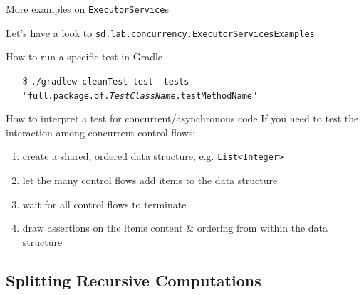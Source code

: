 \documentclass[presentation]{beamer}\mode<presentation>{\usetheme{AMSBolognaFC}}
\begin{document}
\begin{frame}[c]{More examples on \texttt{ExecutorService}s}

	Let's have a look to \texttt{sd.lab.concurrency.\alert{ExecutorServicesExamples}}

	\vfill

	\begin{block}{How to run a specific test in Gradle}
		\begin{itemize}
			\item[\$] \texttt{./gradlew cleanTest test --tests "full.package.of.\textit{TestClassName}.\alert{testMethodName}"}
		\end{itemize}
	\end{block}

	\vfill

	\begin{block}{How to interpret a test for concurrent/asynchronous code}
		If you need to test the interaction among \alert{concurrent} control flows:
		\begin{enumerate}
			\item create a shared, ordered data structure, e.g. \texttt{List<\alert{Integer}>}

			\item let the many control flows add items to the data structure

			\item wait for all control flows to terminate

			\item draw assertions on the items content \& ordering from within the data structure
		\end{enumerate}
	\end{block}

\end{frame}

\subsection{Splitting Recursive Computations}
\end{document}

